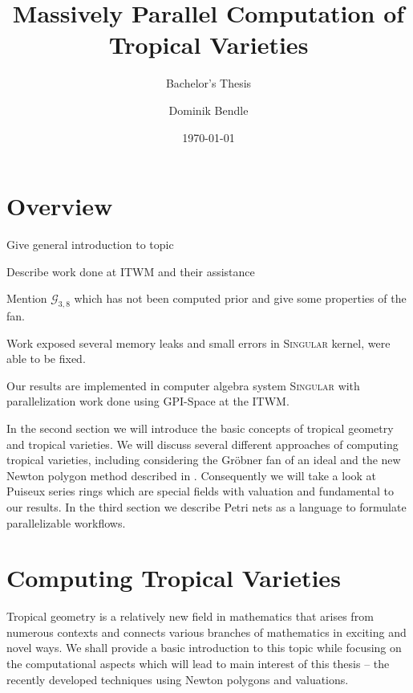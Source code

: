 \documentclass[
  paper=a4,
  DIV=14,
  fontsize=12pt,
  titlepage,
  bibliography=totoc,
  listof=totoc,
  pagesize=pdftex
]{scrartcl}
\title{Massively Parallel Computation of Tropical Varieties}
\subtitle{Bachelor's Thesis}
\author{Dominik Bendle}
\date{\today}
\numberwithin{figure}{section}
\numberwithin{equation}{section}
\numberwithin{table}{section}
\theoremstyle{definition}
\numberwithin{definition}{section}
\begin{document}
\pagestyle{headings}

\maketitle

\tableofcontents
\newpage

\section{Overview}

Give general introduction to topic

Describe work done at ITWM and their assistance

Mention $\mathcal G_{3,8}$ which has not been computed prior and give some properties of the
fan.

Work exposed several memory leaks and small errors in \textsc{Singular} kernel, were able
to be fixed.

Our results are implemented in computer algebra system \textsc{Singular} \cite{Singular}
with parallelization work done using GPI-Space at the ITWM.


In the second section we will introduce the basic concepts of tropical geometry and
tropical varieties. We will discuss several different approaches of computing tropical
varieties, including considering the Gröbner fan of an ideal and the new Newton polygon
method described in \cite{tropPointsLinks}. Consequently we will take a look at Puiseux
series rings which are special fields with valuation and fundamental to our results. In
the third section we describe Petri nets as a language to formulate parallelizable
workflows.


\section{Computing Tropical Varieties}

Tropical geometry is a relatively new field in mathematics that arises from numerous
contexts and connects various branches of mathematics in exciting and novel ways. We shall
provide a basic introduction to this topic while focusing on the computational aspects
which will lead to main interest of this thesis -- the recently developed techniques using
Newton polygons and valuations.
\end{document}
